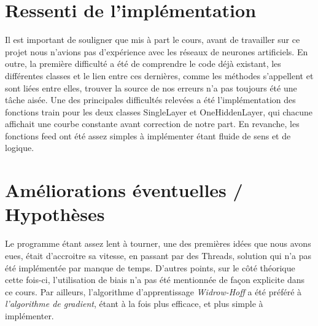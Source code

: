 \section{Ressenti de l'implémentation}

Il est important de souligner que mis à part le cours, avant de travailler sur ce projet nous n’avions pas d’expérience avec les réseaux de neurones artificiels. \newline
En outre, la première difficulté a été de comprendre le code déjà existant, les différentes classes et le lien entre ces dernières, comme les méthodes s'appellent et sont liées entre elles, trouver la source de nos erreurs n'a pas toujours été une tâche aisée.  \newline  \newline
Une des principales difficultés relevées a été l’implémentation des fonctions train pour les deux classes SingleLayer et OneHiddenLayer, qui chacune affichait une courbe constante avant correction de notre part. \newline
En revanche, les fonctions feed ont été assez simples à implémenter étant fluide de sens et de logique.

\section{Améliorations éventuelles / Hypothèses }

Le programme étant assez lent à tourner, une des premières idées que nous avons eues, était d'accroitre sa vitesse, en passant par des Threads, solution qui n'a pas été implémentée par manque de temps. \newline \newline
D'autres points, sur le côté théorique cette fois-ci, l'utilisation de biais n'a pas été mentionnée de façon explicite dans ce cours.  \newline
Par ailleurs, l'algorithme d'apprentissage \textit {Widrow-Hoff} a été préféré à \textit {l'algorithme de gradient}, étant à la fois plus efficace, et plus simple à implémenter.

\clearpage

